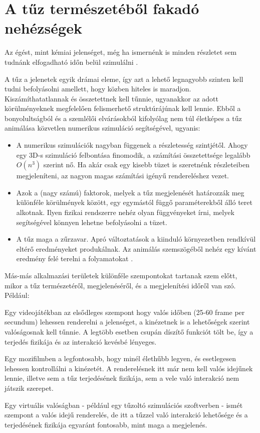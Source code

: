 \section{A tűz természetéből fakadó nehézségek}
Az égést, mint kémiai jelenséget, még ha ismernénk is minden részletet sem tudnánk elfogadható időn belül szimulálni  \cite{firestarter}.

A tűz a jelenetek egyik drámai eleme, így azt a lehető legnagyobb szinten kell tudni befolyásolni amellett, hogy közben hiteles is maradjon. Kiszámíthatatlannak és összetettnek kell tűnnie, ugyanakkor az adott körülményeknek megfelelően felismerhető struktúrájúnak kell lennie. Ebből a bonyolultságból és a szemlélői elvárásokból kifolyólag nem túl életképes a tűz animálása közvetlen numerikus szimuláció segítségével, ugyanis:
\begin{itemize}
\item
A numerikus szimulációk nagyban függenek a részletesség szintjétől. Ahogy egy 3D-s szimuláció felbontása finomodik, a számítási összetettsége legalább $O(n^3)$ szerint nő. Ha akár csak egy kisebb tüzet is szeretnénk részleteiben megjeleníteni, az nagyon magas számítási igényű rendereléshez vezet.
\item
Azok a (nagy számú) faktorok, melyek a tűz megjelenését határozzák meg különféle körülmények között, egy egymástól függő paraméterekből álló teret alkotnak. Ilyen fizikai rendszerre nehéz olyan függvényeket írni, melyek segítségével könnyen lehetne befolyásolni a tüzet. 
\item
A tűz maga a zűrzavar. Apró változtatások a kiinduló környezetben rendkívül eltérő eredményeket produkálnak. Az animálás szemszögéből nehéz egy kívánt eredmény felé terelni a folyamatokat \cite{ArNiStructuralModeling}.
\end{itemize}

Más-más alkalmazási területek különféle szempontokat tartanak szem előtt, mikor a tűz természetéről, megjelenéséről, és a megjelenítési időről van szó. Például:

Egy videojátékban az elsődleges szempont hogy valós időben (25-60 frame per secundum) lehessen renderelni a jelenséget, a kinézetnek is a lehetőségek szerint valóságosnak kell tűnnie. A legtöbb esetben csupán díszítő funkciót tölt be, így a terjedés fizikája és az interakció kevésbé lényeges.

Egy mozifilmben a legfontosabb, hogy minél élethűbb legyen, és esetlegesen lehessen kontrollálni a kinézetét. A renderelésnek itt már nem kell valós idejűnek lennie, illetve sem a tűz terjedésének fizikája, sem a vele való interakció nem játszik szerepet.

Egy virtuális valóságban - például egy tűzoltó szimulációs szoftverben - ismét szempont a valós idejű renderelés, de itt a tűzzel való interakció lehetősége és a terjedésének fizikája egyaránt fontosabb, mint maga a megjelenés.